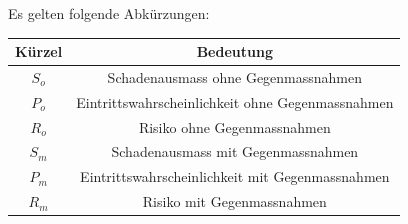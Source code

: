 \documentclass[10pt,a4paper,oneside]{99_fhnwreport}
\begin{document}
Es gelten folgende Abkürzungen:

\begin{center}
\begin{tabular}{|c|c|}
	\hline
	\textbf{Kürzel} &  \textbf{Bedeutung} \\ \hline
	$S_{o}$ & Schadenausmass ohne Gegenmassnahmen \\ \hline
	$P_{o}$ & Eintrittswahrscheinlichkeit ohne Gegenmassnahmen \\ \hline
	$R_{o}$ & Risiko ohne Gegenmassnahmen \\ \hline
	$S_{m}$ & Schadenausmass mit Gegenmassnahmen \\ \hline
	$P_{m}$ & Eintrittswahrscheinlichkeit mit  Gegenmassnahmen \\ \hline
	$R_{m}$ & Risiko mit Gegenmassnahmen \\ \hline
\end{tabular}
\end{center}
\end{document}
